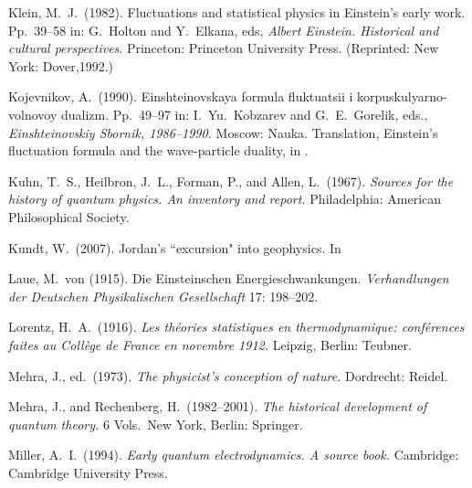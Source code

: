 \documentclass{elsart}
\begin{document}
{\begin{thebibliography}{}
  Klein, M.\ J.\ (1982). Fluctuations and statistical physics in Einstein's early work. Pp.\ 39--58 in: G.\ Holton and Y.\ Elkana, eds, {\it Albert Einstein. Historical and cultural perspectives}. Princeton: Princeton University Press. (Reprinted: New York: Dover,1992.)

  Kojevnikov, A.\ (1990). Einshteinovskaya formula fluktuatsii i korpuskulyarno-volnovoy dualizm. Pp.\ 49--97 in: I.\ Yu.\ Kobzarev and G.\ E.\ Gorelik, eds., {\it Einshteinovskiy Sbornik, 1986--1990.} Moscow: Nauka. Translation, Einstein's fluctuation formula and the wave-particle duality, in \citep[pp.\ 181-228]{Balashov and Vizgin 2002}.

 Kuhn, T.\ S., Heilbron, J.\ L., Forman, P., and Allen, L.\ (1967). {\it Sources for the history of quantum physics. An inventory and report.} Philadelphia: American Philosophical Society.

  Kundt, W.\ (2007). Jordan's ``excursion" into geophysics. In \citep[123--131]{Hoffmann 2007}



 Laue, M.\ von (1915). Die Einsteinschen Energieschwankungen. {\it Verhandlungen der Deutschen Physikalischen Gesellschaft} 17: 198--202.

 Lorentz, H.\ A.\ (1916). {\it Les th\'eories statistiques en thermodynamique: conf\'erences faites au Coll\`ege de France en novembre 1912.} Leipzig, Berlin: Teubner.

 Mehra, J., ed.\ (1973).  {\it The physicist's conception of nature.} Dordrecht: Reidel. 

 Mehra, J., and Rechenberg, H.\ (1982--2001). {\it The historical development of quantum theory.} 6 Vols.\ New York, Berlin: Springer.

 Miller, A.\ I.\ (1994). {\it Early quantum electrodynamics. A source book.} Cambridge: Cambridge University Press.


\end{thebibliography}}
\end{document}
